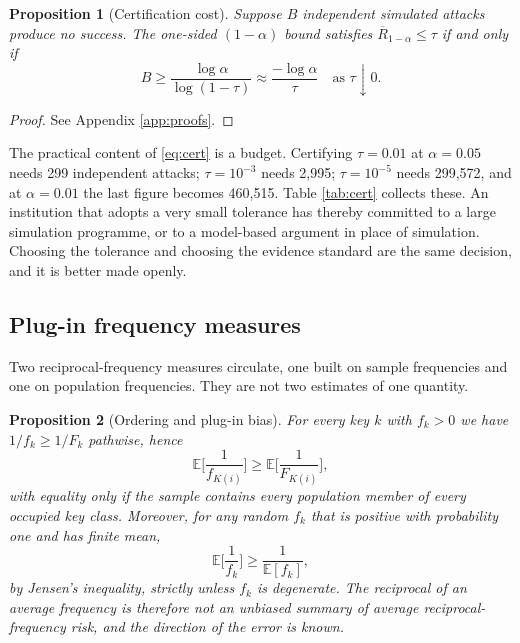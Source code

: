 \documentclass[11pt,a4paper]{article}
\theoremstyle{plain}
\newtheorem{proposition}{Proposition}
\theoremstyle{definition}
\newcommand{\E}{\mathbb{E}}
\begin{document}
\begin{proposition}[Certification cost]\label{prop:cert}
Suppose $B$ independent simulated attacks produce no success. The one-sided
$(1-\alpha)$ bound satisfies $\overline{R}_{1-\alpha} \leq \tau$ if and only if
\begin{equation}
B \geq \frac{\log \alpha}{\log(1 - \tau)} \approx \frac{-\log\alpha}{\tau}
\quad \text{as } \tau \downarrow 0 .
\label{eq:cert}
\end{equation}
\end{proposition}

\begin{proof}
See Appendix \ref{app:proofs}.
\end{proof}

The practical content of \eqref{eq:cert} is a budget. Certifying $\tau = 0.01$
at $\alpha = 0.05$ needs 299 independent attacks; $\tau = 10^{-3}$ needs 2,995;
$\tau = 10^{-5}$ needs 299,572, and at $\alpha = 0.01$ the last figure becomes
460,515. Table \ref{tab:cert} collects these. An institution that adopts a very
small tolerance has thereby committed to a large simulation programme, or to a
model-based argument in place of simulation. Choosing the tolerance and choosing
the evidence standard are the same decision, and it is better made openly.

\subsection{Plug-in frequency measures}

Two reciprocal-frequency measures circulate, one built on sample frequencies
and one on population frequencies. They are not two estimates of one quantity.

\begin{proposition}[Ordering and plug-in bias]\label{prop:plugin}
For every key $k$ with $f_k > 0$ we have $1/f_k \geq 1/F_k$ pathwise, hence
\begin{equation}
\E\Big[\frac{1}{f_{K(i)}}\Big] \geq \E\Big[\frac{1}{F_{K(i)}}\Big] ,
\end{equation}
with equality only if the sample contains every population member of every
occupied key class. Moreover, for any random $f_k$ that is positive with probability one and has
finite mean,
\begin{equation}
\E\Big[\frac{1}{f_k}\Big] \geq \frac{1}{\E[f_k]} ,
\end{equation}
by Jensen's inequality, strictly unless $f_k$ is degenerate. The reciprocal of
an average frequency is therefore not an unbiased summary of average
reciprocal-frequency risk, and the direction of the error is known.
\end{proposition}
\end{document}
